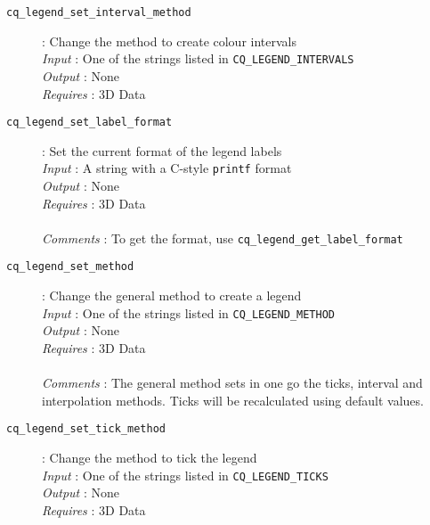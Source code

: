 \documentclass[a4paper,notitlepage,11pt]{article}
\begin{document}
\begin{description}
\item[\texttt{cq\_legend\_set\_interval\_method}]: Change the method to create colour intervals\\
  \emph{Input} : One of the strings listed in \texttt{CQ\_LEGEND\_INTERVALS}\\
  \emph{Output} : None\\
  \emph{Requires} : 3D Data\\
\end{description}

\begin{description}
\item[\texttt{cq\_legend\_set\_label\_format}]: Set the current format of the legend labels\\
  \emph{Input} : A string with a C-style \texttt{printf} format\\
  \emph{Output} : None\\
  \emph{Requires} : 3D Data\\
  \\
  \emph{Comments} : To get the format, use \texttt{cq\_legend\_get\_label\_format}
\end{description}

\begin{description}
\item[\texttt{cq\_legend\_set\_method}]: Change the general method to create a legend\\
  \emph{Input} : One of the strings listed in \texttt{CQ\_LEGEND\_METHOD}\\
  \emph{Output} : None\\
  \emph{Requires} : 3D Data\\
  \\
  \emph{Comments} : The general method sets in one go the ticks, interval and interpolation methods.
  Ticks will be recalculated using default values.
\end{description}

\begin{description}
\item[\texttt{cq\_legend\_set\_tick\_method}]: Change the method to tick the legend\\
  \emph{Input} : One of the strings listed in \texttt{CQ\_LEGEND\_TICKS}\\
  \emph{Output} : None\\
  \emph{Requires} : 3D Data\\
\end{description}
\end{document}
